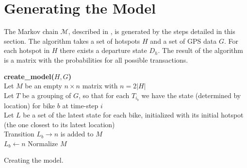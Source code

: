 \section{Generating the Model}\label{sec:generatemarkov}
The Markov chain $\mathcal{M}$, described in , is generated by the steps detailed in this section.
The algorithm takes a set of hotspots $H$ and a set of GPS data $G$. For each hotspot in $H$ there exists a departure state $D_h$.
The result of the algorithm is a matrix with the probabilities for all possible transactions.

\begin{algorithm}[H]
\SetAlgoNoEnd
\textbf{create\_model($H, G$)} \\
Let $M$ be an empty $n \times n$ matrix with $n = 2|H|$ \\
Let $T$ be a grouping of $G$, so that for each $T_{i_b}$ we have the state (determined by location) for bike $b$ at time-step $i$\\
Let $L$ be a set of the latest state for each bike, initialized with its initial hotspot (the one closest to its latest location)\\
  {
    {
    Transition $L_b \rightarrow n$ is added to $M$\\
     $L_b \leftarrow n$}}
Normalize $M$\\
\caption{Creating the model.}
\label{markov:create_model}
\end{algorithm}